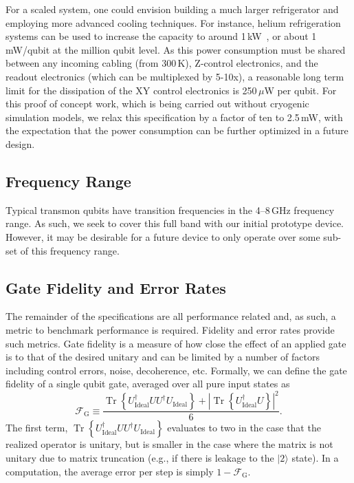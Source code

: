 \documentclass[journal]{IEEEtran}
\DeclareMathOperator{\Tr}{Tr}
\newcommand{\CR}[1]{{\color{black}#1}}
\begin{document}
For a scaled system, one could envision building a much larger refrigerator and employing more advanced cooling techniques. For instance, helium \CR{refrigeration systems} can be used to increase the capacity to around  1\,kW~\CR{\cite{linde}}, or  about 1\,mW/qubit at the million qubit level. As this power consumption must be shared between any incoming cabling (from 300\,K), Z-control electronics, and the readout electronics (which can be multiplexed by 5-10x), a reasonable long term limit for the dissipation of the \CR{XY} control electronics is 250\,$\mu$W per qubit. For this proof of concept work, which is being carried out without cryogenic simulation models, we relax this specification by a factor of ten to 2.5\,mW, with the expectation that the power consumption can be further optimized in a future design. 
\subsection{Frequency Range}
Typical transmon qubits have transition frequencies in the 4--8\,GHz frequency range. As such, we seek to cover this full band with our initial prototype device. However, it may be desirable for a future device to only operate over some sub-set of this frequency range.
\subsection{Gate Fidelity and Error Rates}
The remainder of the specifications are all performance related and, as such, a metric to benchmark performance is required. Fidelity and error rates provide such metrics. Gate fidelity is a measure of how close the effect of an applied gate is to that of the desired unitary and can be limited by a number of factors including control errors, noise, decoherence, etc. Formally, we can define the gate fidelity of a single qubit gate, averaged over all pure input states as~\cite{pedersen2007fidelity}
\begin{equation}
\mathscr{F}_\text{G}\equiv\frac{\Tr\left\{U_\text{Ideal}^\dagger{}UU^\dagger{}U_\text{Ideal}\right\}+\left|\Tr\left\{U_\text{Ideal}^\dagger{}U\right\}\right|^2}{6}.
\end{equation}
The first term, $\Tr\left\{U_\text{Ideal}^\dagger{}UU^\dagger{}U_\text{Ideal}\right\}$ evaluates to two in the case that the realized operator is unitary, but is smaller in the case where the matrix is not unitary due to matrix truncation (e.g., if there is leakage to the $|2\rangle$ state). 
In a computation, the average error per step is simply $1-\mathscr{F}_\text{G}$.
\end{document}
